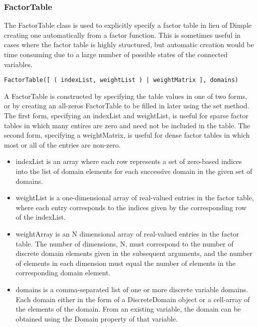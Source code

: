 \fi

\subsubsection{FactorTable}
\label{sec:FactorTable}

The FactorTable class is used to explicitly specify a factor table in lieu of Dimple creating one automatically from a factor function.  This is sometimes useful in cases where the factor table is highly structured, but automatic creation would be time consuming due to a large number of possible states of the connected variables.


\ifmatlab
\begin{lstlisting}
FactorTable([ ( indexList, weightList ) | weightMatrix ], domains)
\end{lstlisting}

A FactorTable is constructed by specifying the table values in one of two forms, or by creating an all-zeros FactorTable to be filled in later using the set method.  The first form, specifying an indexList and weightList, is useful for sparse factor tables in which many entires are zero and need not be included in the table.  The second form, specifying a weightMatrix, is useful for dense factor tables in which most or all of the entries are non-zero.


\begin{itemize}
\item indexList is an array where each row represents a set of zero-based indices into the list of domain elements for each successive domain in the given set of domains.
\item weightList is a one-dimensional array of real-valued entries in the factor table, where each entry corresponds to the indices given by the corresponding row of the indexList.
\item weightArray is an N dimensional array of real-valued entries in the factor table.  The number of dimensions, N, must correspond to the number of discrete domain elements given in the subsequent arguments, and the number of elements in each dimension must equal the number of elements in the corresponding domain element.
\item domains is a comma-separated list of one or more discrete variable domains.  Each domain either in the form of a DiscreteDomain object or a cell-array of the elements of the domain.  From an existing variable, the domain can be obtained using the Domain property of that variable.
\end{itemize}

